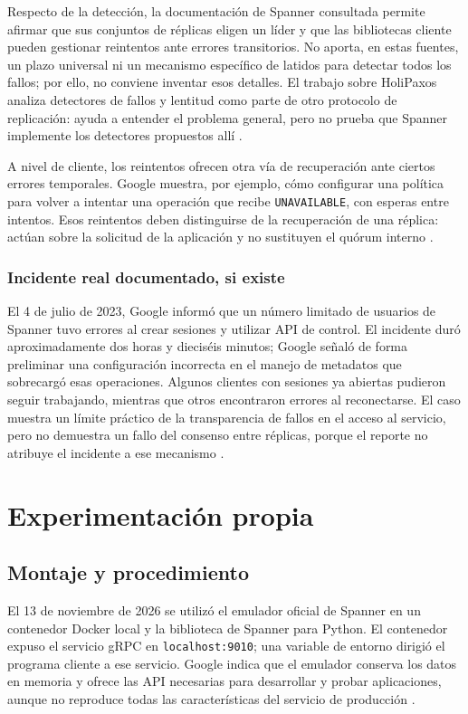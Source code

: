 \documentclass[11pt,a4paper]{article}
\begin{document}
Respecto de la detección, la documentación de Spanner consultada permite afirmar que sus conjuntos de réplicas eligen un líder y que las bibliotecas cliente pueden gestionar reintentos ante errores transitorios. No aporta, en estas fuentes, un plazo universal ni un mecanismo específico de latidos para detectar todos los fallos; por ello, no conviene inventar esos detalles. El trabajo sobre HoliPaxos analiza detectores de fallos y lentitud como parte de otro protocolo de replicación: ayuda a entender el problema general, pero no prueba que Spanner implemente los detectores propuestos allí \cite{GoogleSpannerReplication,GoogleSpannerAPIs,LiangEtAl2025HoliPaxos}.

A nivel de cliente, los reintentos ofrecen otra vía de recuperación ante ciertos errores temporales. Google muestra, por ejemplo, cómo configurar una política para volver a intentar una operación que recibe \texttt{UNAVAILABLE}, con esperas entre intentos. Esos reintentos deben distinguirse de la recuperación de una réplica: actúan sobre la solicitud de la aplicación y no sustituyen el quórum interno \cite{GoogleSpannerRetries,GoogleSpannerReplication}.

\subsubsection{Incidente real documentado, si existe}
El 4 de julio de 2023, Google informó que un número limitado de usuarios de Spanner tuvo errores al crear sesiones y utilizar API de control. El incidente duró aproximadamente dos horas y dieciséis minutos; Google señaló de forma preliminar una configuración incorrecta en el manejo de metadatos que sobrecargó esas operaciones. Algunos clientes con sesiones ya abiertas pudieron seguir trabajando, mientras que otros encontraron errores al reconectarse. El caso muestra un límite práctico de la transparencia de fallos en el acceso al servicio, pero no demuestra un fallo del consenso entre réplicas, porque el reporte no atribuye el incidente a ese mecanismo \cite{GoogleSpannerIncident2023}.

\section{Experimentación propia}
\subsection{Montaje y procedimiento}
El 13 de noviembre de 2026 se utilizó el emulador oficial de Spanner en un contenedor Docker local y la biblioteca de Spanner para Python. El contenedor expuso el servicio gRPC en \texttt{localhost:9010}; una variable de entorno dirigió el programa cliente a ese servicio. Google indica que el emulador conserva los datos en memoria y ofrece las API necesarias para desarrollar y probar aplicaciones, aunque no reproduce todas las características del servicio de producción \cite{GoogleSpannerEmulator}.
\end{document}

